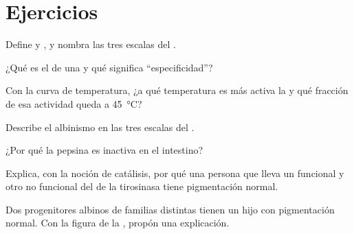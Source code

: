 \section{Ejercicios}

\begin{exercise}[$\star$]\label{exo:g11:enzymes-and-phenotype:1}
Define  y , y nombra las tres escalas del .
\end{exercise}

\begin{exercise}[$\star$]\label{exo:g11:enzymes-and-phenotype:2}
¿Qué es el  de una  y qué significa
``especificidad''?
\end{exercise}

\begin{exercise}[$\star$]\label{exo:g11:enzymes-and-phenotype:3}
Con la curva de temperatura, ¿a qué temperatura es más activa la 
y qué fracción de esa actividad queda a \qty{45}{\celsius}?
\end{exercise}

\begin{exercise}[$\star$]\label{exo:g11:enzymes-and-phenotype:4}
Describe el albinismo en las tres escalas del .
\end{exercise}

\begin{exercise}[$\star$]\label{exo:g11:enzymes-and-phenotype:5}
¿Por qué la pepsina es inactiva en el intestino?
\end{exercise}

\begin{exercise}[$\star\star$]\label{exo:g11:enzymes-and-phenotype:6}
Explica, con la noción de catálisis, por qué una persona que lleva un
 funcional y otro no funcional del  de la tirosinasa tiene
pigmentación normal.
\end{exercise}

\begin{exercise}[$\star\star$]\label{exo:g11:enzymes-and-phenotype:7}
Dos progenitores albinos de familias distintas tienen un hijo con
pigmentación normal. Con la figura de la , propón una
explicación.
\end{exercise}

